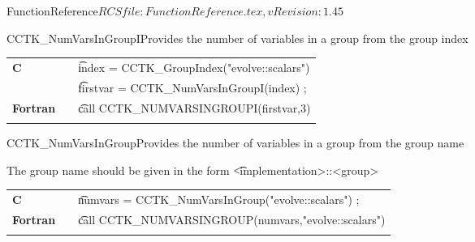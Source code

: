 \begin{cactuspart}{5}{FunctionReference}{$RCSfile: FunctionReference.tex,v $}{$Revision: 1.45 $}
\begin{CCTKFunc}{CCTK\_NumVarsInGroupI}{Provides the number of variables in a group from the group index}
\label{CCTK-NumVarsInGroupI}
\showargs
\begin{params}
\end{params}
\begin{discussion}

\end{discussion}
\begin{examples}
\begin{tabular}{@{}p{3cm}cp{11cm}}
\hfill {\bf C} && {\t index = CCTK\_GroupIndex("evolve::scalars")}\\
               &&{\t firstvar = CCTK\_NumVarsInGroupI(index) ;}
\\
\hfill {\bf Fortran} && {\t call CCTK\_NUMVARSINGROUPI(firstvar,3)}\\
\\
\end{tabular}
\end{examples}
\begin{errorcodes}
\end{errorcodes}
\end{CCTKFunc}




\begin{CCTKFunc}{CCTK\_NumVarsInGroup}{Provides the number of variables in a group from the group name}
\label{CCTK-NumVarsInGroup}
\showargs
\begin{params}
\end{params}
\begin{discussion}
The group name should be given in the form {\t <implementation>::<group>}
\end{discussion}
\begin{examples}
\begin{tabular}{@{}p{3cm}cp{11cm}}
\hfill {\bf C} && {\t numvars = CCTK\_NumVarsInGroup("evolve::scalars") ;}
\\
\hfill {\bf Fortran} && {\t call CCTK\_NUMVARSINGROUP(numvars,"evolve::scalars")}\\
\\
\end{tabular}
\end{examples}
\begin{errorcodes}
\end{errorcodes}
\end{CCTKFunc}




\end{cactuspart}
